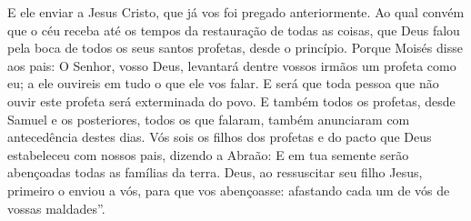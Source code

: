 {E ele enviar a Jesus Cristo, que já vos foi pregado anteriormente.
Ao qual convém que o céu receba até os tempos da restauração de todas as coisas, que Deus falou pela boca de todos os seus santos profetas, desde o princípio.
Porque Moisés disse aos
{} pais: O Senhor, vosso Deus, levantará dentre vossos irmãos um profeta como eu; a ele ouvireis em tudo o que ele vos falar.
E será que toda pessoa
 que não ouvir este profeta será exterminada do povo.
E também todos os profetas, desde Samuel e os posteriores, todos os que falaram, também anunciaram com antecedência destes dias.
Vós sois os filhos dos profetas e do pacto que Deus estabeleceu com nossos pais, dizendo a Abraão: E em tua semente serão abençoadas todas as famílias da terra.
Deus, ao ressuscitar seu filho Jesus, primeiro o enviou a vós, para que
{} vos abençoasse: afastando cada um de vós de vossas maldades”.

}
